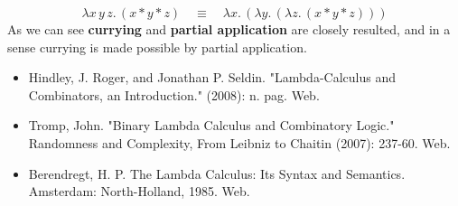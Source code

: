 \documentclass[12pt]{article}
\begin{document}
\begin{enumerate}
$$\lambda x\,y\,z.\, (x * y * z) \quad \equiv \quad \lambda x.\,(\lambda y.\,(\lambda z.\, (x * y * z)))$$ 
As we can see \textbf{currying} and \textbf{partial application} are closely resulted, and in a sense currying is made possible by partial application.
\newline
\begin{itemize}
\item Hindley, J. Roger, and Jonathan P. Seldin. "Lambda-Calculus and Combinators, an Introduction." (2008): n. pag. Web.
\item Tromp, John. "Binary Lambda Calculus and Combinatory Logic." Randomness and Complexity, From Leibniz to Chaitin (2007): 237-60. Web.
\item Berendregt, H. P. The Lambda Calculus: Its Syntax and Semantics. Amsterdam: North-Holland, 1985. Web.
\end{itemize}
\end{enumerate}
\end{document}
